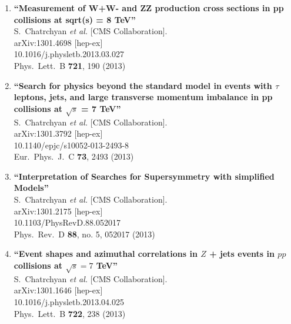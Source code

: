 \documentclass{article}
\begin{document}
\begin{enumerate}
\item%
{\bf ``Measurement of W+W- and ZZ production cross sections in pp collisions at sqrt(s) = 8 TeV''}
  \\{}S.~Chatrchyan {\it et al.}  [CMS Collaboration].
  \\{}arXiv:1301.4698 [hep-ex]
    \\{}10.1016/j.physletb.2013.03.027
\\{}Phys.\ Lett.\ B {\bf 721}, 190 (2013) %


\item%
{\bf ``Search for physics beyond the standard model in events with $\tau$ leptons, jets, and large transverse momentum imbalance in pp collisions at $\sqrt{s}$ = 7 TeV''}
  \\{}S.~Chatrchyan {\it et al.}  [CMS Collaboration].
  \\{}arXiv:1301.3792 [hep-ex]
    \\{}10.1140/epjc/s10052-013-2493-8
\\{}Eur.\ Phys.\ J.\ C {\bf 73}, 2493 (2013) %


\item%
{\bf ``Interpretation of Searches for Supersymmetry with simplified Models''}
  \\{}S.~Chatrchyan {\it et al.}  [CMS Collaboration].
  \\{}arXiv:1301.2175 [hep-ex]
    \\{}10.1103/PhysRevD.88.052017
\\{}Phys.\ Rev.\ D {\bf 88}, no. 5, 052017 (2013) %


\item%
{\bf ``Event shapes and azimuthal correlations in $Z$ + jets events in $pp$ collisions at $\sqrt{s}=7$ TeV''}
  \\{}S.~Chatrchyan {\it et al.}  [CMS Collaboration].
  \\{}arXiv:1301.1646 [hep-ex]
    \\{}10.1016/j.physletb.2013.04.025
\\{}Phys.\ Lett.\ B {\bf 722}, 238 (2013) %



\end{enumerate}
\end{document}
